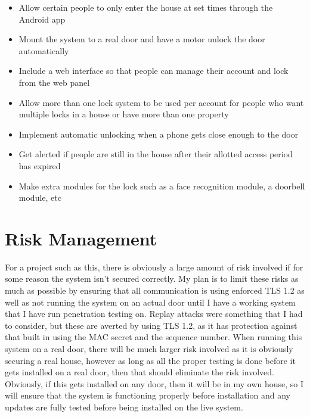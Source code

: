 \begin{itemize}
	\item Allow certain people to only enter the house at set times through the Android app
	\item Mount the system to a real door and have a motor unlock the door automatically
	\item Include a web interface so that people can manage their account and lock from the web panel
	\item Allow more than one lock system to be used per account for people who want multiple locks in a house or have more than one property
	\item Implement automatic unlocking when a phone gets close enough to the door
	\item Get alerted if people are still in the house after their allotted access period has expired
	\item Make extra modules for the lock such as a face recognition module, a doorbell module, etc
\end{itemize}


\section{Risk Management}
For a project such as this, there is obviously a large amount of risk involved if for some reason the system isn't secured correctly. My plan is to limit these risks as much as possible by ensuring that all communication is using enforced TLS 1.2 as well as not running the system on an actual door until I have a working system that I have run penetration testing on. Replay attacks were something that I had to consider, but these are averted by using TLS 1.2, as it has protection against that built in using the MAC secret and the sequence number. When running this system on a real door, there will be much larger risk involved as it is obviously securing a real house, however as long as all the proper testing is done before it gets installed on a real door, then that should eliminate the risk involved. Obviously, if this gets installed on any door, then it will be in my own house, so I will ensure that the system is functioning properly before installation and any updates are fully tested before being installed on the live system.

